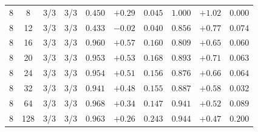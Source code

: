 \begin{table}[t]
\begin{tabular}{cccccccccc}
\midrule
8 & 8 & 3/3 & 3/3 & $0.450$ & $+0.29$ & $0.045$ & $1.000$ & $+1.02$ & $0.000$ \\
8 & 12 & 3/3 & 3/3 & $0.433$ & $-0.02$ & $0.040$ & $0.856$ & $+0.77$ & $0.074$ \\
8 & 16 & 3/3 & 3/3 & $0.960$ & $+0.57$ & $0.160$ & $0.809$ & $+0.65$ & $0.060$ \\
8 & 20 & 3/3 & 3/3 & $0.953$ & $+0.53$ & $0.168$ & $0.893$ & $+0.71$ & $0.063$ \\
8 & 24 & 3/3 & 3/3 & $0.954$ & $+0.51$ & $0.156$ & $0.876$ & $+0.66$ & $0.064$ \\
8 & 32 & 3/3 & 3/3 & $0.941$ & $+0.48$ & $0.155$ & $0.887$ & $+0.58$ & $0.032$ \\
8 & 64 & 3/3 & 3/3 & $0.968$ & $+0.34$ & $0.147$ & $0.941$ & $+0.52$ & $0.089$ \\
8 & 128 & 3/3 & 3/3 & $0.963$ & $+0.26$ & $0.243$ & $0.944$ & $+0.47$ & $0.200$ \\
\bottomrule
\end{tabular}
\end{table}
